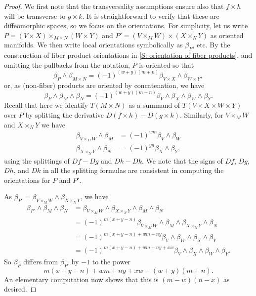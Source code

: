 \begin{proof}
	We first note that the transversality assumptions ensure also that $f \times h$ will be transverse to $g \times k$.
	It is straightforward to verify that these are diffeomorphic spaces, so we focus on the orientations.
	For simplicity, let us write
	$P = (V \times X)\times_{M \times N} (W \times Y)$ and $P' = (V \times_M W) \times (X \times_N Y)$ as oriented manifolds.
	We then write local orientations symbolically as $\beta_P$, etc.
	By the construction of fiber product orientations in \cref{S: orientation of fiber products}, and omitting the pullbacks from the notation, $P$ is oriented so that
	$$\beta_P \wedge \beta_{M \times N} = (-1)^{(w+y)(m+n)}\beta_{V \times X} \wedge \beta_{W \times Y},$$
	or, as (non-fiber) products are oriented by concatenation, we have
	$$\beta_P \wedge \beta_M\wedge\beta_N = (-1)^{(w+y)(m+n)}\beta_V \wedge \beta_X \wedge \beta_W \wedge \beta_Y.$$
	Recall that here we identify $T(M \times N)$ as a summand of $T(V \times X \times W \times Y)$ over $P$ by splitting the derivative $D(f \times h) - D(g \times k)$.
	Similarly, for $V \times_M W$ and $X \times_N Y$ we have
	\begin{align*}
		\beta_{V \times_M W} \wedge \beta_M & = (-1)^{wm}\beta_V \wedge \beta_W \\
		\beta_{X \times_N Y} \wedge \beta_N & = (-1)^{yn}\beta_X \wedge \beta_Y,
	\end{align*}
	using the splittings of $Df-Dg$ and $Dh-Dk$.
	We note that the signs of $Df$, $Dg$, $Dh$, and $Dk$ in all the splitting formulas are consistent in computing the orientations for $P$ and $P'$.

	As $\beta_{P'} = \beta_{V \times_M W} \wedge \beta_{X \times_N Y}$, we have
	\begin{align*}
		\beta_{P'} \wedge \beta_M \wedge \beta_N
		&= \beta_{V \times_M W} \wedge \beta_{X \times_N Y} \wedge \beta_M \wedge \beta_N\\
		& = (-1)^{m(x+y-n)}\beta_{V \times_M W} \wedge \beta_M \wedge \beta_{X \times_N Y} \wedge \beta_N\\
		& = (-1)^{m(x+y-n)+wm+ny}\beta_V \wedge \beta_W \wedge \beta_X \wedge \beta_Y \\
		& = (-1)^{m(x+y-n)+wm+ny+xw}\beta_V \wedge \beta_X \wedge \beta_W \wedge \beta_Y.
	\end{align*}
	So $\beta_P$ differs from $\beta_{P'}$ by $-1$ to the power
	$$m(x+y-n) + wm + ny + xw - (w+y)(m+n).$$
	An elementary computation now shows that this is $(m-w)(n-x)$ as desired.
\end{proof}

